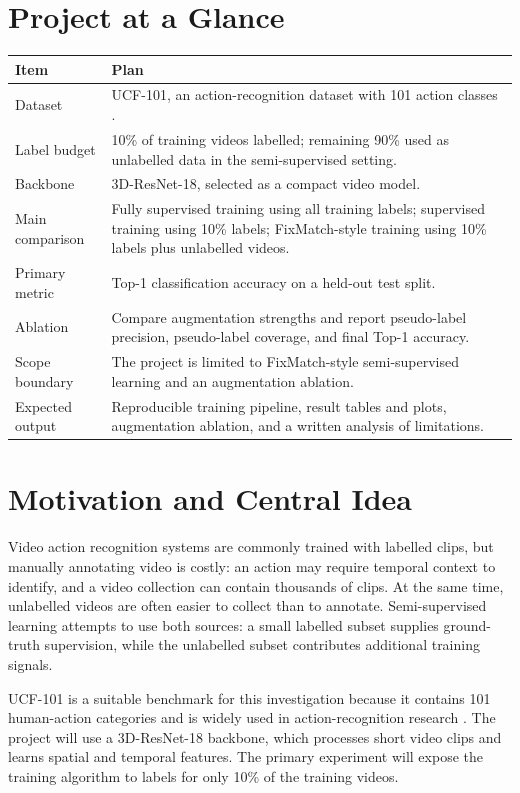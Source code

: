 \documentclass[11pt,a4paper]{article}
\begin{document}
\section*{Project at a Glance}
\begin{tabularx}{\textwidth}{L{3.1cm}Y}
\toprule
\textbf{Item} & \textbf{Plan} \\
\midrule
Dataset & UCF-101, an action-recognition dataset with 101 action classes \cite{ucf101}. \\
Label budget & 10\% of training videos labelled; remaining 90\% used as unlabelled data in the semi-supervised setting. \\
Backbone & 3D-ResNet-18, selected as a compact video model. \\
Main comparison & Fully supervised training using all training labels; supervised training using 10\% labels; FixMatch-style training using 10\% labels plus unlabelled videos. \\
Primary metric & Top-1 classification accuracy on a held-out test split. \\
Ablation & Compare augmentation strengths and report pseudo-label precision, pseudo-label coverage, and final Top-1 accuracy. \\
Scope boundary & The project is limited to FixMatch-style semi-supervised learning and an augmentation ablation. \\
Expected output & Reproducible training pipeline, result tables and plots, augmentation ablation, and a written analysis of limitations. \\
\bottomrule
\end{tabularx}

\section{Motivation and Central Idea}
Video action recognition systems are commonly trained with labelled clips, but manually annotating video is costly: an action may require temporal context to identify, and a video collection can contain thousands of clips. At the same time, unlabelled videos are often easier to collect than to annotate. Semi-supervised learning attempts to use both sources: a small labelled subset supplies ground-truth supervision, while the unlabelled subset contributes additional training signals.

UCF-101 is a suitable benchmark for this investigation because it contains 101 human-action categories and is widely used in action-recognition research \cite{ucf101}. The project will use a 3D-ResNet-18 backbone, which processes short video clips and learns spatial and temporal features. The primary experiment will expose the training algorithm to labels for only 10\% of the training videos.
\end{document}
